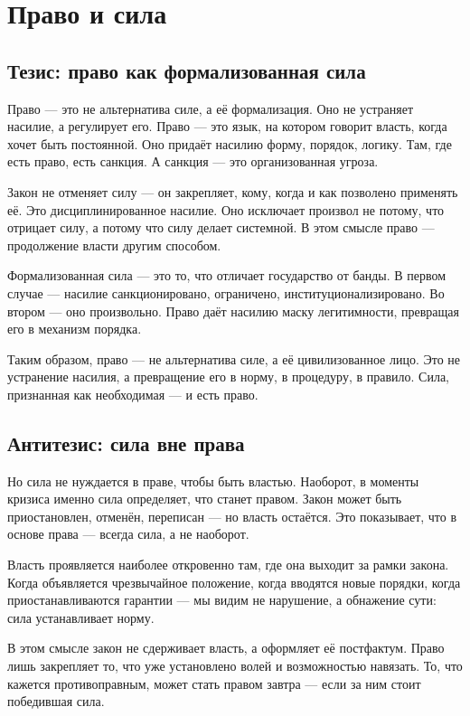 \chapter{Право и сила}

\section{Тезис: право как формализованная сила}

Право — это не альтернатива силе, а её формализация. Оно не устраняет насилие, а регулирует его. Право — это язык, на котором говорит власть, когда хочет быть постоянной. Оно придаёт насилию форму, порядок, логику. Там, где есть право, есть санкция. А санкция — это организованная угроза.

Закон не отменяет силу — он закрепляет, кому, когда и как позволено применять её. Это дисциплинированное насилие. Оно исключает произвол не потому, что отрицает силу, а потому что силу делает системной. В этом смысле право — продолжение власти другим способом.

Формализованная сила — это то, что отличает государство от банды. В первом случае — насилие санкционировано, ограничено, институционализировано. Во втором — оно произвольно. Право даёт насилию маску легитимности, превращая его в механизм порядка.

Таким образом, право — не альтернатива силе, а её цивилизованное лицо. Это не устранение насилия, а превращение его в норму, в процедуру, в правило. Сила, признанная как необходимая — и есть право.

\section{Антитезис: сила вне права}

Но сила не нуждается в праве, чтобы быть властью. Наоборот, в моменты кризиса именно сила определяет, что станет правом. Закон может быть приостановлен, отменён, переписан — но власть остаётся. Это показывает, что в основе права — всегда сила, а не наоборот.

Власть проявляется наиболее откровенно там, где она выходит за рамки закона. Когда объявляется чрезвычайное положение, когда вводятся новые порядки, когда приостанавливаются гарантии — мы видим не нарушение, а обнажение сути: сила устанавливает норму.

В этом смысле закон не сдерживает власть, а оформляет её постфактум. Право лишь закрепляет то, что уже установлено волей и возможностью навязать. То, что кажется противоправным, может стать правом завтра — если за ним стоит победившая сила.

